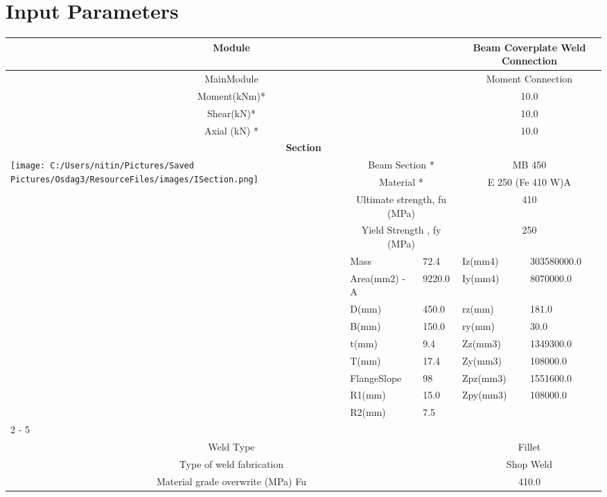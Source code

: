 \documentclass{article}%
\begin{document}
%
\normalsize%
\pagestyle{header}%
\section{Input Parameters}%
\label{sec:InputParameters}%
\renewcommand{\arraystretch}{1.2}%
\begin{longtable}{|p{5cm}|p{2cm}|p{2cm}|p{2cm}|p{5cm}|}%
\hline%
\hline%
\multicolumn{3}{|c|}{Module}&\multicolumn{2}{|c|}{Beam Coverplate  Weld Connection}\\%
\hline%
\hline%
\multicolumn{3}{|c|}{MainModule}&\multicolumn{2}{|c|}{Moment Connection}\\%
\hline%
\hline%
\multicolumn{3}{|c|}{Moment(kNm)*}&\multicolumn{2}{|c|}{10.0}\\%
\hline%
\hline%
\multicolumn{3}{|c|}{Shear(kN)*}&\multicolumn{2}{|c|}{10.0}\\%
\hline%
\hline%
\multicolumn{3}{|c|}{Axial (kN) *}&\multicolumn{2}{|c|}{10.0}\\%
\hline%
\hline%
\multicolumn{5}{|c|}{\textbf{Section}}\\%
\hline%
\hline%
\multirow{13}{*}{\texttt{[image: C:/Users/nitin/Pictures/Saved Pictures/Osdag3/ResourceFiles/images/ISection.png]}}&\multicolumn{2}{|c|}{Beam Section *}&\multicolumn{2}{|c|}{MB 450}\\%
\cline{2%
-%
5}%
&\multicolumn{2}{|c|}{Material *}&\multicolumn{2}{|c|}{E 250 (Fe 410 W)A}\\%
\cline{2%
-%
5}%
&\multicolumn{2}{|c|}{Ultimate strength, fu (MPa)}&\multicolumn{2}{|c|}{410}\\%
\cline{2%
-%
5}%
&\multicolumn{2}{|c|}{Yield Strength , fy (MPa)}&\multicolumn{2}{|c|}{250}\\%
\cline{2%
-%
5}%
&Mass&72.4&Iz(mm4)&303580000.0\\%
\cline{2%
-%
5}%
&Area(mm2) {-} A&9220.0&Iy(mm4)&8070000.0\\%
\cline{2%
-%
5}%
&D(mm)&450.0&rz(mm)&181.0\\%
\cline{2%
-%
5}%
&B(mm)&150.0&ry(mm)&30.0\\%
\cline{2%
-%
5}%
&t(mm)&9.4&Zz(mm3)&1349300.0\\%
\cline{2%
-%
5}%
&T(mm)&17.4&Zy(mm3)&108000.0\\%
\cline{2%
-%
5}%
&FlangeSlope&98&Zpz(mm3)&1551600.0\\%
\cline{2%
-%
5}%
&R1(mm)&15.0&Zpy(mm3)&108000.0\\%
\cline{2%
-%
5}%
&R2(mm)&7.5&&\\%
\cline{2%
-%
5}%
\hline%
\multicolumn{5}{|c|}{\textbf{Weld Details}}\\%
\hline%
\hline%
\multicolumn{3}{|c|}{Weld Type}&\multicolumn{2}{|c|}{Fillet}\\%
\hline%
\hline%
\multicolumn{3}{|c|}{Type of weld fabrication}&\multicolumn{2}{|c|}{Shop Weld}\\%
\hline%
\hline%
\multicolumn{3}{|c|}{Material grade overwrite (MPa) Fu}&\multicolumn{2}{|c|}{410.0}\\%
\hline%
\end{longtable}
\end{document}
